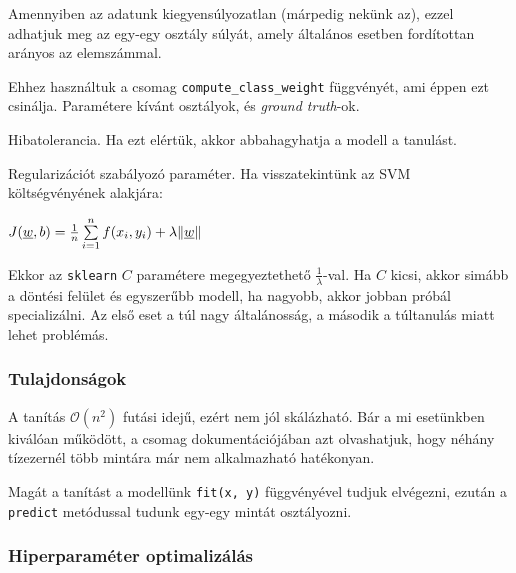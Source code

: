 
Amennyiben az adatunk kiegyensúlyozatlan (márpedig nekünk az), ezzel adhatjuk meg
az egy-egy osztály súlyát, amely általános esetben fordítottan arányos az elemszámmal.

Ehhez használtuk a csomag \texttt{compute\_class\_weight} függvényét, ami éppen ezt csinálja.
Paramétere  kívánt osztályok, és \textit{ground truth}-ok.



Hibatolerancia. Ha ezt elértük, akkor abbahagyhatja a modell a tanulást.





Regularizációt\cite{sklearn.regularization} szabályozó paraméter. Ha visszatekintünk az SVM költségvényének alakjára:

$ J(\underline{w},b)  = \frac{1}{n} \sum\limits_{i=1}^{n} 
f(x_i, y_i) + \lambda \lVert\underline{w}\rVert $

\noindent
Ekkor az \texttt{sklearn} $ C $ paramétere megegyeztethető $ \frac{1}{\lambda} $-val.
Ha $ C $ kicsi, akkor simább a döntési felület és egyszerűbb modell, ha nagyobb, akkor 
jobban próbál specializálni. Az első eset a túl nagy általánosság, a második a túltanulás
miatt lehet problémás.




\subsubsection{Tulajdonságok}

\noindent
A tanítás $ \mathcal{O}(n^2) $ futási idejű, ezért nem jól skálázható. Bár a mi 
esetünkben kiválóan működött, a csomag dokumentációjában azt olvashatjuk, hogy néhány tízezernél
több mintára már nem alkalmazható hatékonyan.


Magát a tanítást a modellünk \texttt{fit(x, y)} függvényével tudjuk elvégezni, ezután 
a \texttt{predict} metódussal tudunk egy-egy mintát osztályozni.



\subsubsection{Hiperparaméter optimalizálás}
\label{sec:svm.hiperparameter.optimalizalas}

